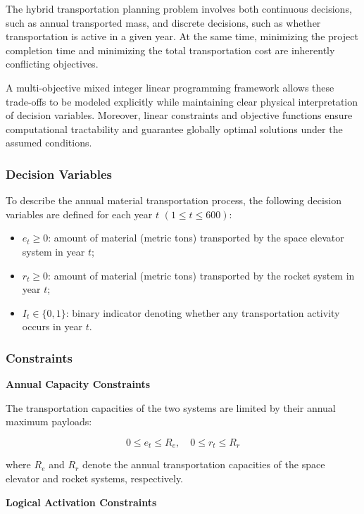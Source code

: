 \documentclass{mcmthesis}
\begin{document}
The hybrid transportation planning problem involves both continuous decisions, such as annual transported mass, and discrete decisions, such as whether transportation is active in a given year.
At the same time, minimizing the project completion time and minimizing the total transportation cost are inherently conflicting objectives.

A multi-objective mixed integer linear programming framework allows these trade-offs to be modeled explicitly while maintaining clear physical interpretation of decision variables. Moreover, linear constraints and objective functions ensure computational tractability and guarantee globally optimal solutions under the assumed conditions.

\subsubsection{Decision Variables}

To describe the annual material transportation process, the following decision variables are defined for each year $t$ $(1 \le t \le 600)$:

\begin{itemize}
    \item $e_t \ge 0$: amount of material (metric tons) transported by the space elevator system in year $t$;
    \item $r_t \ge 0$: amount of material (metric tons) transported by the rocket system in year $t$;
    \item $I_t \in \{0,1\}$: binary indicator denoting whether any transportation activity occurs in year $t$.
\end{itemize}


\subsubsection{Constraints}

\textbf{Annual Capacity Constraints}

The transportation capacities of the two systems are limited by their annual maximum payloads:

\begin{equation}
    0 \le e_t \le R_e, \quad 0 \le r_t \le R_r
\end{equation}

where $R_e$ and $R_r$ denote the annual transportation capacities of the space elevator and rocket systems, respectively.


\textbf{Logical Activation Constraints}
\end{document}
